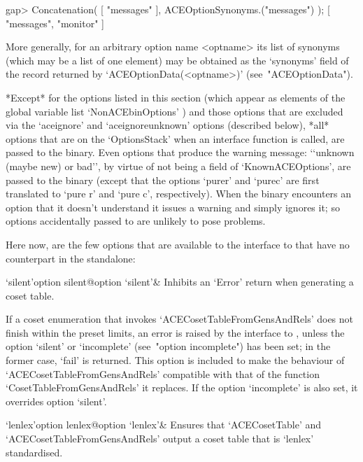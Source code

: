\beginexample
gap> Concatenation( [ "messages" ], ACEOptionSynonyms.("messages") );
[ "messages", "monitor" ]
\endexample

More generally, for an arbitrary option name  <optname>  its  list  of
synonyms (which may be a list of one element) may be obtained  as  the
`synonyms' field of the record returned by  `ACEOptionData(<optname>)'
(see~"ACEOptionData").


*Except* for the options listed  in  this  section  (which  appear  as
elements of the global  variable  list  `NonACEbinOptions'{\undoquotes
{}})  and  those  options
that are excluded via the `aceignore' and  `aceignoreunknown'  options
(described below), *all* options that are on the  `OptionsStack'  when
an {\ACE} interface function is  called,  are  passed  to  the  {\ACE}
binary. Even options that produce the warning  message:  \lq{}`unknown
(maybe  new)  or  bad'',  by  virtue  of  not   being   a   field   of
`KnownACEOptions', are passed to the {\ACE} binary  (except  that  the
options `purer' and `purec' are first translated to `pure r' and `pure
c', respectively). When the {\ACE} binary encounters an option that it
doesn't understand it issues a  warning  and  simply  ignores  it;  so
options accidentally passed to {\ACE} are unlikely to pose problems.

Here now, are the  few  options  that  are  available  to  the  {\GAP}
interface to {\ACE} that have no counterpart in the {\ACE} standalone:

\beginitems

\>`silent'{option silent}@{option `silent'}& 
Inhibits an `Error' return when generating a coset table.

If a coset  enumeration  that  invokes  `ACECosetTableFromGensAndRels'
does not finish within the preset limits, an error is  raised  by  the
interface to  {\GAP},  unless  the  option  `silent'  or  `incomplete'
(see~"option incomplete") has been set; in the former case, `fail'  is
returned.  This  option  is  included  to  make   the   behaviour   of
`ACECosetTableFromGensAndRels' compatible with that  of  the  function
`CosetTableFromGensAndRels' it replaces. If the option `incomplete' is
also set, it overrides option `silent'.

\>`lenlex'{option lenlex}@{option `lenlex'}& 
Ensures that `ACECosetTable' and `ACECosetTableFromGensAndRels' output
a coset table that is `lenlex' standardised.

